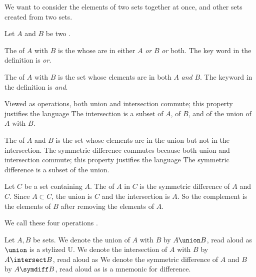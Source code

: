 
\sbasic











\sstart
{}


We want to consider the elements of two sets
together at once, and other sets created
from two sets.


Let $A$ and $B$ be two .

The  of $A$ with $B$ is the
 whose  are
in either $A$ \textit{or} $B$ \textit{or} both.
The key word in the definition is \textit{or}.

The  of $A$ with $B$ is
the set whose elements are in both $A$ \textit{and} $B$.
The keyword in the definition is \textit{and}.

Viewed as operations, both union and intersection commute;
this property justifies the language 
The intersection is a subset of $A$, of $B$,
and of the union of $A$ with $B$.

The 
of $A$ and $B$ is the set whose elements are in the union
but not in the intersection.
The symmetric difference commutes because both union and
intersection commute; this property justifies the
language 
The symmetric difference is a subset of the union.


Let $C$ be a set containing $A$.
The  of $A$ in $C$ is
the symmetric difference of $A$ and $C$.
Since $A \subset C$, the union is $C$ and the
intersection is $A$.
So the complement is the  elements of $B$ after removing the elements of $A$.

We call these four operations
.


Let $A, B$ be sets.
We denote the union of $A$ with $B$ by $A \union B$, read aloud as 
$\union$ is a stylized U.
We denote the intersection of $A$ with $B$ by $A \intersect B$, read aloud as 
We denote the symmetric difference of $A$ and $B$ by $A \symdiff B$, read aloud as 
 is a mnemonic for difference.

